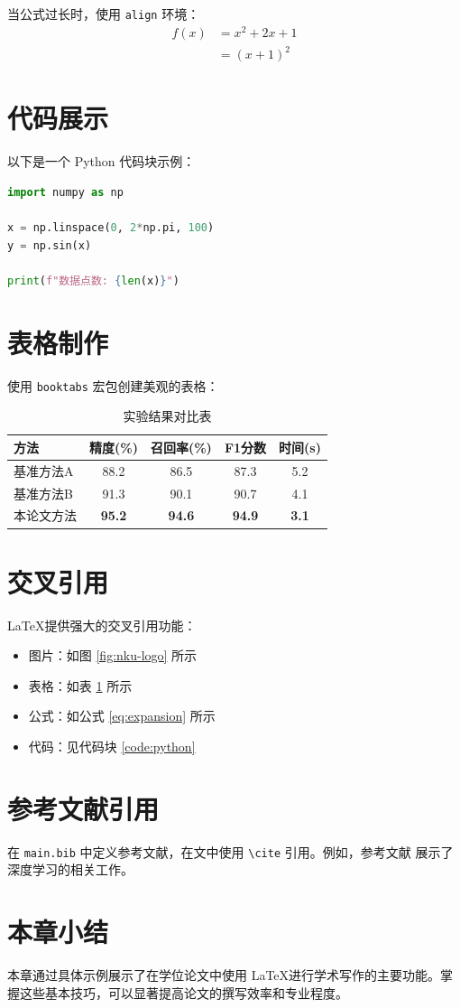 当公式过长时，使用 \texttt{align} 环境：
\begin{align}
    f(x) &= x^2 + 2x + 1 \\
    &= (x+1)^2
    \label{eq:expansion}
\end{align}

\section{代码展示}

以下是一个 Python 代码块示例：

\begin{lstlisting}[language=Python, caption={Python 代码示例}, label=code:python]
import numpy as np

x = np.linspace(0, 2*np.pi, 100)
y = np.sin(x)

print(f"数据点数: {len(x)}")
\end{lstlisting}

\section{表格制作}

使用 \texttt{booktabs} 宏包创建美观的表格：

\begin{table}[htbp]
    \centering
    \caption{实验结果对比表}
    \label{tab:results}
    \begin{tabular}{lcccc}
        \toprule
        方法 & 精度(\%) & 召回率(\%) & F1分数 & 时间(s) \\
        \midrule
        基准方法A & 88.2 & 86.5 & 87.3 & 5.2 \\
        基准方法B & 91.3 & 90.1 & 90.7 & 4.1 \\
        本论文方法 & \textbf{95.2} & \textbf{94.6} & \textbf{94.9} & \textbf{3.1} \\
        \bottomrule
    \end{tabular}
\end{table}

\section{交叉引用}

\LaTeX 提供强大的交叉引用功能：

\begin{itemize}
    \item 图片：如图 \ref{fig:nku-logo} 所示
    \item 表格：如表 \ref{tab:results} 所示
    \item 公式：如公式 \eqref{eq:expansion} 所示
    \item 代码：见代码块 \ref{code:python}
\end{itemize}

\section{参考文献引用}

在 \texttt{main.bib} 中定义参考文献，在文中使用 \texttt{\textbackslash cite} 引用。例如，参考文献 \cite{Goodfellow2016,LeCun2015} 展示了深度学习的相关工作。

\section{本章小结}

本章通过具体示例展示了在学位论文中使用 \LaTeX 进行学术写作的主要功能。掌握这些基本技巧，可以显著提高论文的撰写效率和专业程度。
